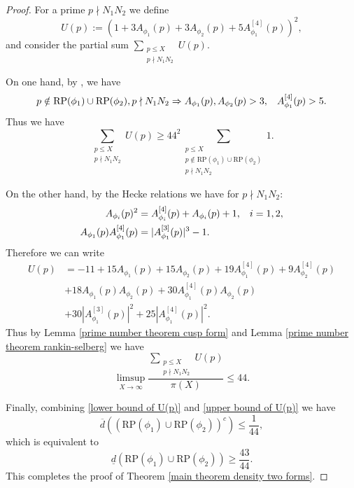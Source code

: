 \documentclass[10pt,leqno]{amsart}
\theoremstyle{plain}
\theoremstyle{definition}
\theoremstyle{remark}
\numberwithin{equation}{section}
\newcommand{\RP}{\text{RP}}
\begin{document}
\begin{proof}
    For a prime $p\nmid N_1N_2$ we define 
    $$U(p) := (1+3A_{\phi_1}(p)+3A_{\phi_2}(p)+5A^{[4]}_{\phi_1}(p))^2,$$
    and consider the partial sum $\sum_{\substack{p \leq X \\ p\nmid N_1N_2}} U(p)$. 
    
    On one hand, by \cite[Lemma 2.1]{LuoZhouMR3928043}, we have 
    $$p \notin \RP(\phi_1) \cup \RP(\phi_2) , p\nmid N_1N_2\Rightarrow A_{\phi_1}(p),A_{\phi_2}(p)>3, \hspace{3mm} A^{[4]}_{\phi_1}(p)>5.$$
    Thus we have 
    \begin{equation}\label{lower bound of U(p)}
        \sum_{\substack{p \leq X \\ p\nmid N_1N_2}} U(p) \geq 44^2 \sum_{\substack{p \leq X \\ p \notin \RP(\phi_1) \cup \RP(\phi_2)\\p\nmid N_1N_2}} 1. 
    \end{equation}

    On the other hand, by the Hecke relations we have for $p\nmid N_1N_2$: 
    \begin{align*}
        A_{\phi_i}(p)^2 &= A^{[4]}_{\phi_i}(p) + A_{\phi_i}(p) + 1, \hspace{3mm} i=1,2, \\
        A_{\phi_1}(p)A^{[4]}_{\phi_1}(p) &= |A_{\phi_1}^{[3]}(p)|^3 - 1.
    \end{align*}
    Therefore we can write
    \begin{align*}
        U(p) &= -11 + 15A_{\phi_1}(p) + 15A_{\phi_2}(p) + 19A^{[4]}_{\phi_1}(p) + 9A^{[4]}_{\phi_2}(p) \\
        &+ 18A_{\phi_1}(p)A_{\phi_2}(p) + 30A^{[4]}_{\phi_1}(p)A_{\phi_2}(p) \\
        &+30|A^{[3]}_{\phi_1}(p)|^2+25|A^{[4]}_{\phi_1}(p)|^2.
    \end{align*}
    Thus by Lemma \ref{prime number theorem cusp form} and Lemma \ref{prime number theorem rankin-selberg} we have 
    \begin{equation}\label{upper bound of U(p)}
        \limsup_{X \to \infty} \frac{\sum_{\substack{p \leq X \\ p\nmid N_1N_2}}U(p)}{\pi(X)} \leq 44. 
    \end{equation}

    Finally, combining \eqref{lower bound of U(p)} and \eqref{upper bound of U(p)} we have 
    $$\overline{d}((\RP(\phi_1) \cup \RP(\phi_2))^c) \leq \frac{1}{44},$$
    which is equivalent to 
    $$\underline{d}(\RP(\phi_1) \cup \RP(\phi_2)) \geq \frac{43}{44}.$$
    This completes the proof of Theorem \ref{main theorem density two forms}.
\end{proof}
\end{document}
